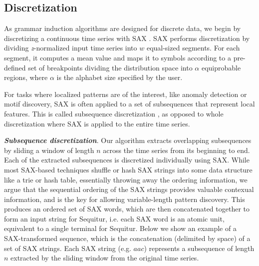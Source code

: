 \documentclass{llncs}
\begin{document}
\subsection{Discretization}
As grammar induction algorithms are designed for discrete data, we begin by discretizing a continuous time series with SAX \cite{sax}. SAX performs discretization by dividing \textit{z}-normalized input time series into $w$ equal-sized segments. For each segment, it computes a mean value and maps it to symbols according to a pre-defined set of breakpoints dividing the distribution space into $\alpha$ equiprobable regions, where $\alpha$ is the alphabet size specified by the user. 


For tasks where localized patterns are of the interest, like anomaly detection or motif discovery, SAX is often applied to a set of subsequences that represent local features. This is called subsequence discretization \cite{lin_motifs}, as opposed to whole discretization where SAX is applied to the entire time series.



\textit{\textbf{Subsequence discretization}}. Our algorithm extracts overlapping subsequences by sliding a window of length $n$ across the time series from its beginning to end. Each of the extracted subsequences is discretized individually using SAX. While most SAX-based techniques shuffle or hash SAX strings into some data structure like a trie or hash table, essentially throwing away the ordering information, we argue that the sequential ordering of the SAX strings provides valuable contexual information, and is the key for allowing variable-length pattern discovery. This produces an ordered set of SAX words, which are then concatenated together to form an input string for Sequitur, i.e. each SAX word is an atomic unit, equivalent to a single terminal for Sequitur. Below we show an example of a SAX-transformed sequence, which is the concatenation (delimited by space) of a set of SAX strings. Each SAX string (e.g. $aac$) represents a subsequence of length $n$ extracted by the sliding window from the original time series.
\end{document}
